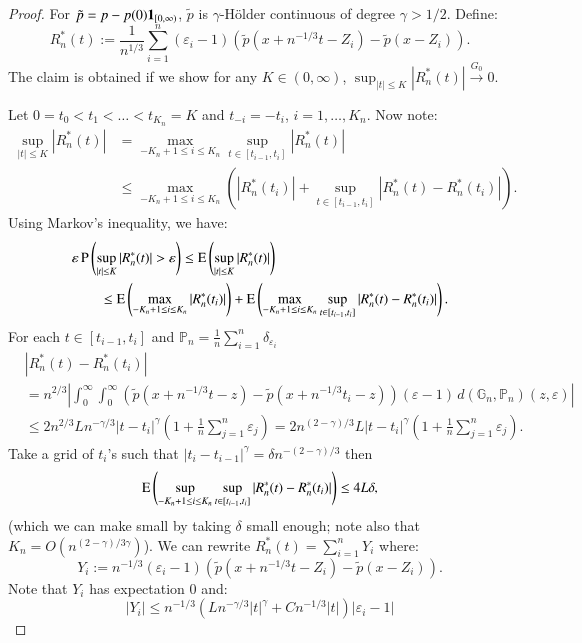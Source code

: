 \begin{proof}
For $\tilde{p} = p - p(0)\mathbf{1}_{[0,\infty)}$, $\tilde{p}$ is $\gamma$-H\"{o}lder continuous of
degree $\gamma > 1/2$. Define:
	\[ R_n^*(t) := \frac{1}{n^{1/3}} \sum_{i=1}^n (\varepsilon_i - 1) \left( \tilde{p}(x+n^{-1/3}t-Z_i) - \tilde{p}(x-Z_i) \right). \]
The claim is obtained if we show for any $K \in (0,\infty)$, $\sup_{|t|\le K} |R_n^*(t)| \xrightarrow{G_0} 0$.

Let $0 = t_0 < t_1 < \dots < t_{K_n} = K$ and $t_{-i} = -t_i$, $i=1, \dots, K_n$. Now note:
\begin{align*}
	\sup_{|t|\le K} |R_n^*(t)| &= \max_{-K_n+1 \le i \le K_n} \sup_{t \in [t_{i-1}, t_i]} |R_n^*(t)| \\
	&\le \max_{-K_n+1 \le i \le K_n} \left( |R_n^*(t_i)| + \sup_{t \in [t_{i-1}, t_i]} |R_n^*(t) - R_n^*(t_i)| \right).
\end{align*}
Using Markov's inequality, we have:
\begin{align*}
&\varepsilon \, \mathrm{P} \left( \sup_{|t|\le K} |R_n^*(t)| > \varepsilon \right) \le \mathrm{E} \left( \sup_{|t|\le K} |R_n^*(t)| \right) \\
&\quad \quad \le \mathrm{E} \left( \max_{-K_n+1 \le i \le K_n} |R_n^*(t_i)| \right) + \mathrm{E} \left( \max_{-K_n+1 \le i \le K_n} \sup_{t \in [t_{i-1}, t_i]} |R_n^*(t) - R_n^*(t_i)| \right).
\end{align*}
For each $t \in [t_{i-1}, t_i]$ and $\mathbb{P}_n = \frac{1}{n} \sum_{i=1}^n \delta_{\varepsilon_i}$
\begin{align*}
&|R_n^*(t) - R_n^*(t_i)| \\
& = n^{2/3} \left| \int_0^\infty \int_0^\infty \left( \tilde{p}(x+n^{-1/3}t-z) - \tilde{p}(x+n^{-1/3}t_i-z) \right) (\varepsilon-1) \, d(\mathbb{G}_n, \mathbb{P}_n)(z,\varepsilon) \right| \\
& \le 2 n^{2/3} L n^{-\gamma/3} |t-t_i|^\gamma \left( 1 + \frac{1}{n} \sum_{j=1}^n \varepsilon_j \right) = 2 n^{(2-\gamma)/3} L |t-t_i|^\gamma \left( 1 + \frac{1}{n} \sum_{j=1}^n \varepsilon_j \right).
\end{align*}
Take a grid of $t_i$'s such that $|t_i - t_{i-1}|^\gamma = \delta n^{-(2-\gamma)/3}$
then
\[ \mathrm{E} \left( \sup_{-K_n+1 \le i \le K_n} \sup_{t \in [t_{i-1}, t_i]} |R_n^*(t) - R_n^*(t_i)| \right) \le 4 L \delta,\]
(which we can make small by taking $\delta$ small enough; note also that $K_n = O(n^{(2-\gamma)/3\gamma})$). We can rewrite $R_n^*(t) = \sum_{i=1}^n Y_i$ where:
\[ Y_i := n^{-1/3} (\varepsilon_i - 1) \left( \tilde{p}(x+n^{-1/3}t-Z_i) - \tilde{p}(x-Z_i) \right). \]
Note that $Y_i$ has expectation $0$ and:
\[ |Y_i| \le n^{-1/3} (L n^{-\gamma/3} |t|^\gamma + C n^{-1/3} |t|) |\varepsilon_i-1| \]

\end{proof}
